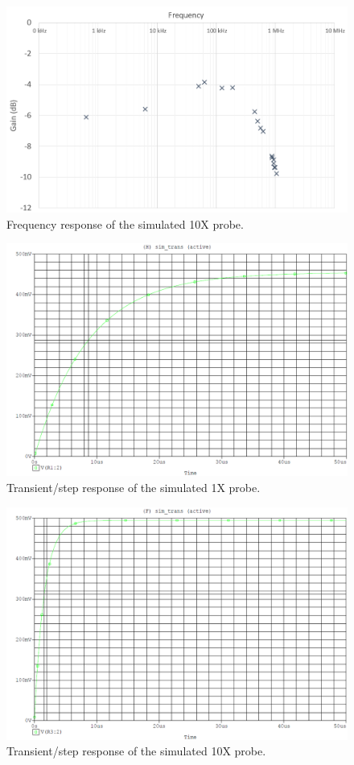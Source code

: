 \documentclass{report}
\begin{document}
\begin{figure}[h]
	\centering
	\includegraphics[width=0.7\linewidth]{exp4c10x}
	\caption{Frequency response of the simulated 10X probe.}
	\label{fig:exp4c10x}
\end{figure}

\begin{figure}[h]
	\centering
	\includegraphics[width=0.7\linewidth]{exp4d1x}
	\caption{Transient/step response of the simulated 1X probe.}
	\label{fig:exp4d1x}
\end{figure}

\begin{figure}[h]
	\centering
	\includegraphics[width=0.7\linewidth]{exp4d10x}
	\caption{Transient/step response of the simulated 10X probe.}
	\label{fig:exp4d10x}
\end{figure}
\end{document}
